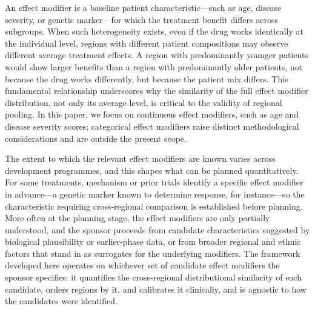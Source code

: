 \documentclass[AMA,Times1COL]{WileyNJDv5}
\begin{document}
An effect modifier is a baseline patient characteristic---such as age, disease severity, or genetic marker---for which the treatment benefit differs across subgroups. When such heterogeneity exists, even if the drug works identically at the individual level, regions with different patient compositions may observe different average treatment effects. A region with predominantly younger patients would show larger benefits than a region with predominantly older patients, not because the drug works differently, but because the patient mix differs. This fundamental relationship underscores why the similarity of the full effect modifier distribution, not only its average level, is critical to the validity of regional pooling. In this paper, we focus on continuous effect modifiers, such as age and disease severity scores; categorical effect modifiers raise distinct methodological considerations and are outside the present scope.

The extent to which the relevant effect modifiers are known varies across development programmes, and this shapes what can be planned quantitatively.\cite{komiyama2024} For some treatments, mechanism or prior trials identify a specific effect modifier in advance---a genetic marker known to determine response, for instance---so the characteristic requiring cross-regional comparison is established before planning. More often at the planning stage, the effect modifiers are only partially understood, and the sponsor proceeds from candidate characteristics suggested by biological plausibility or earlier-phase data, or from broader regional and ethnic factors that stand in as surrogates for the underlying modifiers.\cite{komiyama2024} The framework developed here operates on whichever set of candidate effect modifiers the sponsor specifies: it quantifies the cross-regional distributional similarity of each candidate, orders regions by it, and calibrates it clinically, and is agnostic to how the candidates were identified.
\end{document}
